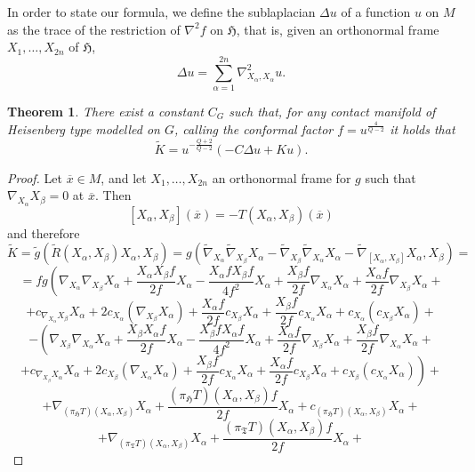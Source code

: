 \documentclass{article}
\newcommand{\g}[1]{\mathfrak{#1}}
\newcommand{\alfa}{\alpha}
\newtheorem{teorema}[proposizione]{Theorem}
\theoremstyle{definition}
\theoremstyle{remark}
\begin{document}
In order to state our formula, we define the sublaplacian $\Delta u$ of a function $u$ on $M$ as the trace of the restriction of $\nabla^2f$ on $\g{H}$, that is, given an orthonormal frame $X_1,\ldots,X_{2n}$ of $\g{H}$,
$$\Delta u = \sum_{\alfa=1}^{2n}\nabla^2_{X_{\alfa},X_{\alfa}}u.$$

\begin{teorema}\label{TeoremaFormulaConforme}
 There exist a constant $C_G$ such that, for any contact manifold of Heisenberg type modelled on $G$, calling the conformal factor $f=u^{\frac{4}{Q-2}}$ it holds that
 $$\widetilde{K} = u^{-\frac{Q+2}{Q-2}}\left(-C\Delta u + Ku \right).$$
\end{teorema}

\begin{proof}
 Let $\overline{x}\in M$, and let $X_1,\ldots,X_{2n}$ an orthonormal frame for $g$ such that $\nabla_{X_{\alfa}}X_{\beta}=0$ at $\overline{x}$. Then
 $$[X_{\alfa},X_{\beta}](\overline{x}) = -T(X_{\alfa},X_{\beta})(\overline{x})$$
 and therefore
 $$\widetilde{K} =\widetilde{g}(\widetilde{R}(X_{\alfa},X_{\beta})X_{\alfa},X_{\beta}) = g(\widetilde{\nabla}_{X_{\alfa}}\widetilde{\nabla}_{X_{\beta}}X_{\alfa}-\widetilde{\nabla}_{X_{\beta}}\widetilde{\nabla}_{X_{\alfa}}X_{\alfa}-\widetilde{\nabla}_{[X_{\alfa},X_{\beta}]}X_{\alfa},X_{\beta}) =$$
 $$= fg\left(\nabla_{X_{\alfa}}\nabla_{X_{\beta}}X_{\alfa} + \frac{X_{\alfa}X_{\beta}f}{2f}X_{\alfa} - \frac{X_{\alfa}fX_{\beta}f}{4f^2}X_{\alfa} + \frac{X_{\beta}f}{2f}\nabla_{X_{\alfa}}X_{\alfa} +  \frac{X_{\alfa}f}{2f}\nabla_{X_{\beta}}X_{\alfa}+\right.$$
 $$ + c_{\nabla_{X_{\alfa}}X_{\beta}}X_{\alfa} + 2c_{X_{\alfa}}(\nabla_{X_{\beta}}X_{\alfa})+ \frac{X_{\alfa}f}{2f}c_{X_{\beta}}X_{\alfa} + \frac{X_{\beta}f}{2f}c_{X_{\alfa}}X_{\alfa} + c_{X_{\alfa}}(c_{X_{\beta}}X_{\alfa}) +$$
 $$-\left( \nabla_{X_{\beta}}\nabla_{X_{\alfa}}X_{\alfa} + \frac{X_{\beta}X_{\alfa}f}{2f}X_{\alfa} - \frac{X_{\beta}fX_{\alfa}f}{4f^2}X_{\alfa} + \frac{X_{\alfa}f}{2f}\nabla_{X_{\beta}}X_{\alfa} +  \frac{X_{\beta}f}{2f}\nabla_{X_{\alfa}}X_{\alfa} +\right.$$
 $$\left.+ c_{\nabla_{X_{\beta}}X_{\alfa}}X_{\alfa} + 2c_{X_{\beta}}(\nabla_{X_{\alfa}}X_{\alfa}) + \frac{X_{\beta}f}{2f}c_{X_{\alfa}}X_{\alfa} + \frac{X_{\alfa}f}{2f}c_{X_{\beta}}X_{\alfa} + c_{X_{\beta}}(c_{X_{\alfa}}X_{\alfa})\right) +$$
 $$+\nabla_{(\pi_{\g{H}}T)(X_{\alfa},X_{\beta})}X_{\alfa} + \frac{(\pi_{\g{H}}T)(X_{\alfa},X_{\beta})f}{2f}X_{\alfa} + c_{(\pi_{\g{H}}T)(X_{\alfa},X_{\beta})}X_{\alfa} +$$
 $$ +\nabla_{(\pi_{\g{T}}T)(X_{\alfa},X_{\beta})}X_{\alfa} + \frac{(\pi_{\g{T}}T)(X_{\alfa},X_{\beta})f}{2f}X_{\alfa} +$$

\end{proof}
\end{document}
